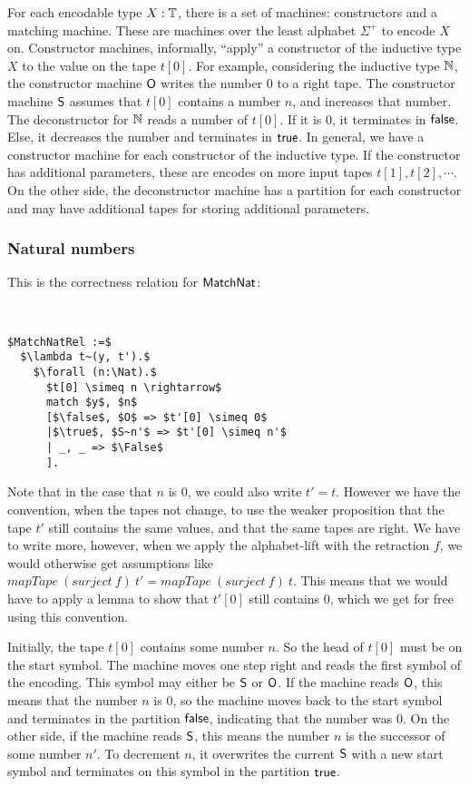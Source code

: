 For each encodable type $X:\mathbb{T}$, there is a set of machines: constructors and a matching machine.  These are machines over the least alphabet
$\Sigma^+$ to encode $X$ on.  Constructor machines, informally, ``apply'' a constructor of the inductive type $X$ to the value on the tape $t[0]$.
For example, considering the inductive type $\mathbb{N}$, the constructor machine $\mathsf{O}$ writes the number $0$ to a right tape.  The constructor machine
$\mathsf{S}$ assumes that $t[0]$ contains a number $n$, and increases that number.  The deconstructor for $\mathbb{N}$ reads a number of $t[0]$.  If it is $0$,
it terminates in $\mathsf{false}$.  Else, it decreases the number and terminates in $\mathsf{true}$.  In general, we have a constructor machine for each constructor
of the inductive type.  If the constructor has additional parameters, these are encodes on more input tapes $t[1], t[2], \cdots$.  On the other side,
the deconstructor machine has a partition for each constructor and may have additional tapes for storing additional parameters.

\subsubsection{Natural numbers}
\label{sec:match-nat}

This is the correctness relation for $\mathsf{MatchNat}$:
\begin{definition}
  \label{def:MatchNat_Rel}
  ~
\begin{lstlisting}[style=semicoqstyle]
$MatchNatRel :=$
  $\lambda t~(y, t').$
    $\forall (n:\Nat).$
      $t[0] \simeq n \rightarrow$
      match $y$, $n$
      [$\false$, $O$ => $t'[0] \simeq 0$
      |$\true$, $S~n'$ => $t'[0] \simeq n'$
      | _, _ => $\False$
      ].
\end{lstlisting}
\end{definition}

Note that in the case that $n$ is $0$, we could also write $t'=t$.  However we have the convention, when the tapes not change, to use the weaker
proposition that the tape $t'$ still contains the same values, and that the same tapes are right.  We have to write more, however, when we apply the
alphabet-lift with the retraction $f$, we would otherwise get assumptions like $mapTape~(surject~f)~t' = mapTape~(surject~f)~t$.  This means that we
would have to apply a lemma to show that $t'[0]$ still contains $0$, which we get for free using this convention.

Initially, the tape $t[0]$ contains some number $n$.  So the head of $t[0]$ must be on the start symbol.  The machine moves one step right and reads
the first symbol of the encoding.  This symbol may either be $\mathsf{S}$ or $\mathsf{O}$.  If the machine reads $\mathsf{O}$, this means that the number $n$ is
$0$, so the machine moves back to the start symbol and terminates in the partition $\mathsf{false}$, indicating that the number was $0$.  On the other side,
if the machine reads $\mathsf{S}$, this means the number $n$ is the successor of some number $n'$.  To decrement $n$, it overwrites the current $\mathsf{S}$
with a new start symbol and terminates on this symbol in the partition $\mathsf{true}$.

